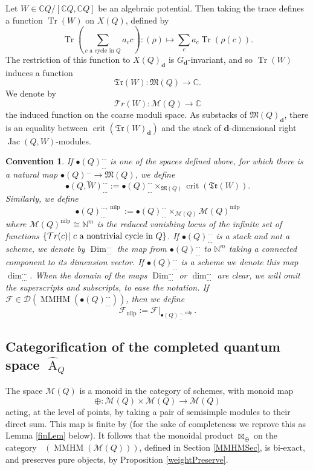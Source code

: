 \documentclass[a4paper,10pt]{amsart}
\newtheorem{convention}[theorem]{Convention}
\newcommand{\dd}{\mathbf{d}}
\newcommand{\WW}{\mathcal{T}r(W)}
\newcommand{\WWW}{\mathfrak{Tr}(W)}
\newcommand{\Mst}{\mathfrak{M}}
\newcommand{\Msp}{\mathcal{M}}
\DeclareMathOperator{\nilp}{nilp}
\DeclareMathOperator{\Dim}{Dim}
\DeclareMathOperator{\Ror}{A}
\DeclareMathOperator{\crit}{crit}
\DeclareMathOperator{\MMHM}{MMHM}
\DeclareMathOperator{\Jac}{Jac}
\DeclareMathOperator{\Tr}{Tr}
\DeclareMathOperator{\Dulf}{\mathcal{D}^{\geq, lf}}
\newcommand{\Dub}{\mathcal{D}}
\begin{document}
Let $W\in\mathbb{C}Q/[\mathbb{C}Q,\mathbb{C}Q]$ be an algebraic potential.  Then taking the trace defines a function $\Tr(W)$ on $X(Q)$, defined by
\[
\Tr\left(\sum_{c \textrm{ a cycle in }Q}a_cc\right)\colon (\rho)\mapsto \sum_c a_c\Tr(\rho(c)).
\]
The restriction of this function to $X(Q)_\dd$ is $G_\dd$-invariant, and so $\Tr(W)$ induces a function 
\[
\mathfrak{Tr}(W)\colon \Mst(Q)\rightarrow \mathbb{C}.  
\]
We denote by 
\[
\WW\colon\Msp(Q)\rightarrow \mathbb{C}
\]
the induced function on the coarse moduli space.  As substacks of $\Mst(Q)_{\dd}$, there is an equality between $\crit(\WWW_{\dd})$ and the stack of $\dd$-dimensional right $\Jac(Q,W)$-modules.
\begin{convention}
\label{QWconvention}
If $\bullet(Q)^{\ldots}_{\ldots}$ is one of the spaces defined above, for which there is a natural map $\bullet(Q)^{\ldots}_{\ldots}\rightarrow\Mst(Q)$, we define
\[
\bullet(Q,W)^{\ldots}_{\ldots}:=\bullet(Q)^{\ldots}_{\ldots}\times_{\Mst(Q)} \crit(\WWW).
\]
Similarly, we define 
\[
\bullet(Q)^{\ldots,\nilp}_{\ldots}:=\bullet(Q)^{\ldots}_{\ldots}\times_{\Msp(Q)} \Msp(Q)^{\nilp}
\]
where $\Msp(Q)^{\nilp}\cong\mathbb{N}^m$ is the reduced vanishing locus of the infinite set of functions $\{\mathcal{T}r(c)|\hbox{ }c\textrm{ a nontrivial cycle in }Q\}$.  If $\bullet(Q)^{\ldots}_{\ldots}$ is a stack and not a scheme, we denote by $\Dim_{\ldots}^{\ldots}$ the map from $\bullet(Q)^{\ldots}_{\ldots}$ to $\mathbb{N}^{m}$ taking a connected component to its dimension vector.  If $\bullet(Q)^{\ldots}_{\ldots}$ is a scheme we denote this map $\dim_{\ldots}^{\ldots}$.  When the domain of the maps $\Dim_{\ldots}^{\ldots}$ or $\dim_{\ldots}^{\ldots}$ are clear, we will omit the superscripts and subscripts, to ease the notation.  If $\mathcal{F}\in\Dub(\MMHM(\bullet(Q)^{\ldots}_{\ldots}))$, then we define
\[
\mathcal{F}_{\nilp}:=\mathcal{F}|_{\bullet(Q)^{\ldots,\nilp}_{\ldots}}.
\]
\end{convention}


\subsection{Categorification of the completed quantum space $\hat{\Ror}_Q$}
The space $\Msp(Q)$ is a monoid in the category of schemes, with monoid map 
\[
\oplus\colon\Msp(Q)\times\Msp(Q)\rightarrow \Msp(Q)
\]
acting, at the level of points, by taking a pair of semisimple modules to their direct sum.  This map is finite by \cite[Lem.2.1]{MeRe14} (for the sake of completeness we reprove this as Lemma \ref{finLem} below).  It follows that the monoidal product $\boxtimes_{\oplus}$ on the category $\Dulf\left(\MMHM(\Msp(Q))\right)$, defined in Section \ref{MMHMSec}, is bi-exact, and preserves pure objects, by Proposition \ref{weightPreserve}.  
\end{document}
